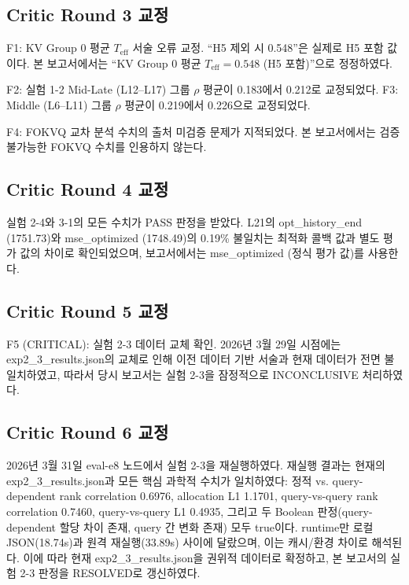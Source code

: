 \documentclass[11pt,a4paper]{article}
\newcommand{\teff}{T_\mathrm{eff}}
\begin{document}
\subsection{Critic Round 3 교정}

F1: KV Group 0 평균 $\teff$ 서술 오류 교정. ``H5 제외 시 0.548''은 실제로 H5 포함 값이다. 본 보고서에서는 ``KV Group 0 평균 $\teff = 0.548$ (H5 포함)''으로 정정하였다.

F2: 실험 1-2 Mid-Late (L12--L17) 그룹 $\rho$ 평균이 0.183에서 0.212로 교정되었다. F3: Middle (L6--L11) 그룹 $\rho$ 평균이 0.219에서 0.226으로 교정되었다.

F4: FOKVQ 교차 분석 수치의 출처 미검증 문제가 지적되었다. 본 보고서에서는 검증 불가능한 FOKVQ 수치를 인용하지 않는다.

\subsection{Critic Round 4 교정}

실험 2-4와 3-1의 모든 수치가 PASS 판정을 받았다. L21의 opt\_history\_end (1751.73)와 mse\_optimized (1748.49)의 0.19\% 불일치는 최적화 콜백 값과 별도 평가 값의 차이로 확인되었으며, 보고서에서는 mse\_optimized (정식 평가 값)를 사용한다.

\subsection{Critic Round 5 교정}

F5 (CRITICAL): 실험 2-3 데이터 교체 확인. 2026년 3월 29일 시점에는 exp2\_3\_results.json의 교체로 인해 이전 데이터 기반 서술과 현재 데이터가 전면 불일치하였고, 따라서 당시 보고서는 실험 2-3을 잠정적으로 INCONCLUSIVE 처리하였다.

\subsection{Critic Round 6 교정}

2026년 3월 31일 eval-e8 노드에서 실험 2-3을 재실행하였다. 재실행 결과는 현재의 exp2\_3\_results.json과 모든 핵심 과학적 수치가 일치하였다: 정적 vs. query-dependent rank correlation 0.6976, allocation L1 1.1701, query-vs-query rank correlation 0.7460, query-vs-query L1 0.4935, 그리고 두 Boolean 판정(query-dependent 할당 차이 존재, query 간 변화 존재) 모두 true이다. runtime만 로컬 JSON(18.74s)과 원격 재실행(33.89s) 사이에 달랐으며, 이는 캐시/환경 차이로 해석된다. 이에 따라 현재 exp2\_3\_results.json을 권위적 데이터로 확정하고, 본 보고서의 실험 2-3 판정을 RESOLVED로 갱신하였다.
\end{document}
